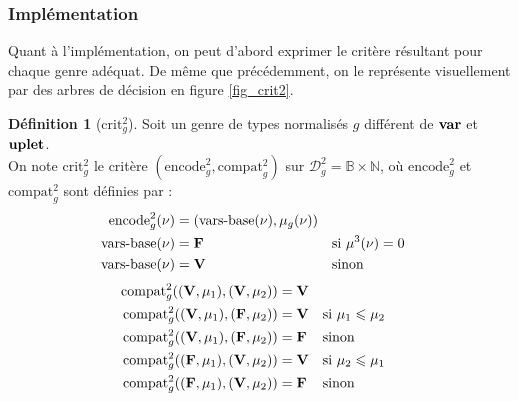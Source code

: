 \documentclass[a4paper]{report}
\theoremstyle{definition}
\newtheorem{definition}[theoreme]{Définition}
\newcommand{\mathhyphen}{{\hbox{-}}}
\begin{document}
\subsubsection{Implémentation}

Quant à l'implémentation, on peut d'abord exprimer le critère résultant pour chaque genre adéquat. De même que précédemment, on le représente visuellement par des arbres de décision en figure \ref{fig_crit2}.

\begin{definition}[$\mathrm{crit}^2_g$]
  Soit un genre de types normalisés $g$ différent de $\bold{var}$ et $\bold{uplet}$. \\
  On note $\mathrm{crit}^2_g$ le critère $(\mathrm{encode}^2_g, \mathrm{compat}^2_g)$ sur $\mathscr{D}^2_{g} = \mathbb{B} \times \mathbb{N}$, où $\mathrm{encode}^2_g$ et $\mathrm{compat}^2_g$ sont définies par :
  \begin{align*}
      \mathrm{encode}^2_g (\nu) &=
      (\mathrm{vars\mathhyphen base} (\nu), \mu_g (\nu))
    \\
      \mathrm{vars\mathhyphen base} (\nu) &=
      \bold{F} &&
      \text{si } \mu^3 (\nu) = 0
    \\
      \mathrm{vars\mathhyphen base} (\nu) &=
      \bold{V} &&
      \text{sinon}
  \end{align*}
  \begin{align*}
      \mathrm{compat}^2_g ((\bold{V}, \mu_1), (\bold{V}, \mu_2)) &=
      \bold{V}
    \\
      \mathrm{compat}^2_g ((\bold{V}, \mu_1), (\bold{F}, \mu_2)) &=
      \bold{V} &&
      \text{si } \mu_1 \leqslant \mu_2
    \\
      \mathrm{compat}^2_g ((\bold{V}, \mu_1), (\bold{F}, \mu_2)) &=
      \bold{F} &&
      \text{sinon}
    \\
      \mathrm{compat}^2_g ((\bold{F}, \mu_1), (\bold{V}, \mu_2)) &=
      \bold{V} &&
      \text{si } \mu_2 \leqslant \mu_1
    \\
      \mathrm{compat}^2_g ((\bold{F}, \mu_1), (\bold{V}, \mu_2)) &=
      \bold{F} &&
      \text{sinon}
  \end{align*}
\end{definition}
\end{document}

